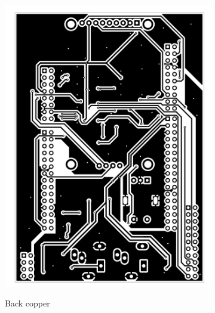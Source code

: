 \documentclass[a4paper,twoside,12pt]{book}
\begin{document}
\begin{figure}[H]
\begin{subfigure}[h]{0.273\textwidth}
        \includegraphics[width=\textwidth]{images/Board_back}
        \label{fig:board2}
        \caption{Back copper}
    \end{subfigure}
    ~
    \begin{subfigure}[h]{0.273\textwidth}

\end{subfigure}
\end{figure}
\end{document}
